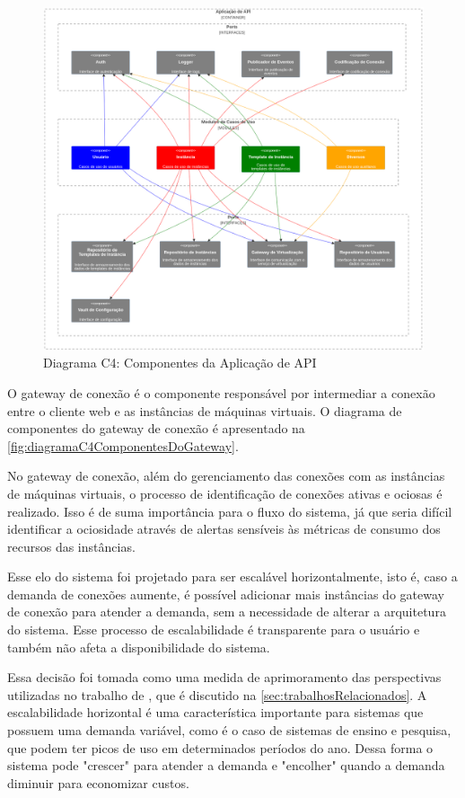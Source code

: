 \begin{figure}[H]
\caption{Diagrama C4: Componentes da Aplicação de API}
\label{fig:diagramaC4ComponentesDaAPI}
\includegraphics[width=\textwidth]{capitulos/2-metodologia/files/c4-component-api.png}
\end{figure}

O gateway de conexão é o componente responsável por intermediar a conexão entre o cliente web e as instâncias de máquinas virtuais. O diagrama de componentes do gateway de conexão é apresentado na \autoref{fig:diagramaC4ComponentesDoGateway}.

No gateway de conexão, além do gerenciamento das conexões com as instâncias de máquinas virtuais, o processo de identificação de conexões ativas e ociosas é realizado. Isso é de suma importância para o fluxo do sistema, já que seria difícil identificar a ociosidade através de alertas sensíveis às métricas de consumo dos recursos das instâncias.

Esse elo do sistema foi projetado para ser escalável horizontalmente, isto é, caso a demanda de conexões aumente, é possível adicionar mais instâncias do gateway de conexão para atender a demanda, sem a necessidade de alterar a arquitetura do sistema. Esse processo de escalabilidade é transparente para o usuário e também não afeta a disponibilidade do sistema.

Essa decisão foi tomada como uma medida de aprimoramento das perspectivas utilizadas no trabalho de \citet{edufirestick}, que é discutido na \autoref{sec:trabalhosRelacionados}. A escalabilidade horizontal é uma característica importante para sistemas que possuem uma demanda variável, como é o caso de sistemas de ensino e pesquisa, que podem ter picos de uso em determinados períodos do ano. Dessa forma o sistema pode "crescer" para atender a demanda e "encolher" quando a demanda diminuir para economizar custos.

